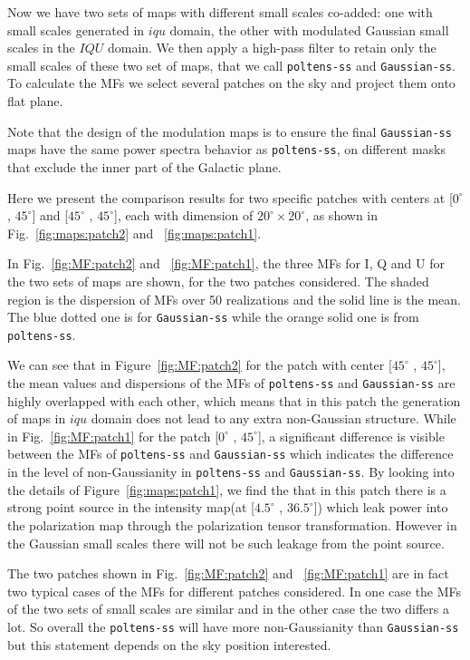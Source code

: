 \documentclass[twocolumn]{aastex631}
\begin{document}
Now we have two sets of maps with different small scales co-added: one with small scales generated in $iqu$ domain, the other with modulated Gaussian small scales in the $IQU$ domain. We then apply a high-pass filter to retain only the small scales of these two set of maps, that we call \texttt{poltens-ss} and \texttt{Gaussian-ss}. To calculate the MFs we select several patches on the sky and project them onto flat plane.

Note that the design of the modulation maps is to ensure the final \texttt{Gaussian-ss} maps  have the same power spectra behavior as \texttt{poltens-ss}, on different masks that exclude the inner part of the Galactic plane. 

Here we present the comparison results for two specific patches with centers at [$0^{\circ}$ , $45^{\circ} $] and [$45^{\circ}$ , $45^{\circ} $], each with dimension of $20^{\circ}\times20^{\circ}$,  as shown in Fig.~\ref{fig:maps:patch2} and ~\ref{fig:maps:patch1}.

In Fig.~\ref{fig:MF:patch2} and ~\ref{fig:MF:patch1}, the three MFs for I, Q and U for the two sets of maps are shown, for the two patches considered. The shaded region is the dispersion of MFs over 50 realizations and the solid line is the mean. The blue dotted one is for \texttt{Gaussian-ss} while the orange solid one is from \texttt{poltens-ss}.

We can see that in Figure~\ref{fig:MF:patch2} for the patch with center [$45^{\circ}$ , $45^{\circ} $], the mean values and dispersions of the MFs of \texttt{poltens-ss} and \texttt{Gaussian-ss} are highly overlapped with each other, which means that in this patch the generation of maps in $iqu$ domain does not lead to any extra non-Gaussian structure. While in Fig.~\ref{fig:MF:patch1} for the patch [$0^{\circ}$ , $45^{\circ} $], a significant difference is visible between the MFs of \texttt{poltens-ss} and \texttt{Gaussian-ss} which indicates the difference in the level of non-Gaussianity in \texttt{poltens-ss} and \texttt{Gaussian-ss}. By looking into the details of Figure~\ref{fig:maps:patch1}, we find the that in this patch there is a strong point source in the intensity map(at [$4.5^{\circ}$ , $36.5^{\circ} $]) which leak power into the polarization map through the polarization tensor transformation. However in the Gaussian small scales there will not be such leakage from the point source.  

The two patches shown in Fig.~\ref{fig:MF:patch2} and ~\ref{fig:MF:patch1} are in fact two typical cases of the MFs for different patches considered. In one case the MFs of the two sets of small scales are similar and in the other case the two differs a lot. So overall the \texttt{poltens-ss} will have more non-Gaussianity than \texttt{Gaussian-ss} but this statement depends on the sky position interested. 
\end{document}
